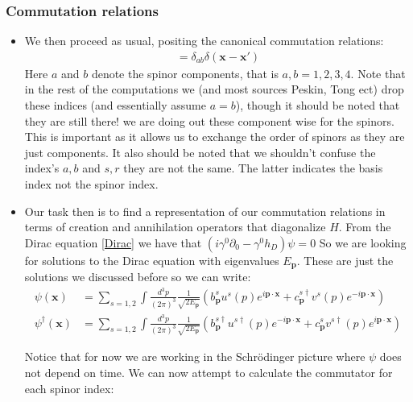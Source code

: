 \documentclass[11pt]{article}
\numberwithin{equation}{section}
\begin{document}
  \subsubsection{Commutation relations}
  \begin{itemize}
    \item We then proceed as usual, positing the canonical commutation relations: 
    \begin{align*}
    [\psi_{a}(\textbf{x}),\psi^{\dagger}_{b}(\textbf{x}')] = \delta_{ab}\delta(\textbf{x}-\textbf{x}')
    \end{align*}
    Here $a$ and $b$ denote the spinor components, that is $a,b=1,2,3,4$. Note that in the rest of the computations we (and most sources Peskin, Tong ect) drop these indices (and essentially assume $a=b$), though it should be noted that they are still there! we are doing out these component wise for the spinors. This is important as it allows us to exchange the order of spinors as they are just components. It also should be noted that we shouldn't confuse the index's $a,b$ and $s,r$ they are not the same. The latter indicates the basis index not the spinor index. 

     \item  Our task then is to find a representation of our commutation relations in terms of creation and annihilation operators that diagonalize $H$. From the Dirac equation \ref{Dirac} we have that $(i\gamma^0\partial_{0}-\gamma^0h_{D})\psi =0 $ So we are looking for solutions to the Dirac equation with eigenvalues $E_{\textbf{p}}$. These are just the solutions we discussed before so we can write: 
    \begin{align}
    \label{psi}
      \psi(\textbf{x}) &= \sum_{s=1,2}\int \frac{d^3p}{(2\pi)^3}\frac{1}{\sqrt{2E_{\textbf{p}}}}\left(b^{s}_{\textbf{p}}u^s(p)e^{i\textbf{p}\cdot\textbf{x}}+c^{s \dagger}_{\textbf{p}}v^s(p)e^{-i\textbf{p}\cdot\textbf{x}}\right)  \\
      \label{psi_d}
      \psi^{\dagger}(\textbf{x}) &= \sum_{s=1,2}\int \frac{d^3p}{(2\pi)^3}\frac{1}{\sqrt{2E_{\textbf{p}}}}\left(b^{s \dagger}_{\textbf{p}}u^{s\dagger}(p)e^{-i\textbf{p}\cdot\textbf{x}}+c^{s }_{\textbf{p}}v^{s\dagger}(p)e^{i\textbf{p}\cdot\textbf{x}}\right) 
    \end{align}

    Notice that for now we are working in the Schr\"odinger picture where $\psi$ does not depend on time. 
    We can now attempt to calculate the commutator for each spinor index: 
    \end{itemize}
\end{document}
